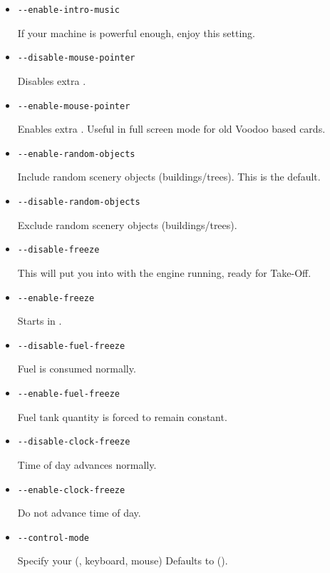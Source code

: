 \begin{itemize}
\item{\texttt{-$ $-enable-intro-music}}

  If your machine is powerful enough, enjoy this setting.

\item{\texttt{-$ $-disable-mouse-pointer}}

  Disables extra .

\item{\texttt{-$ $-enable-mouse-pointer}}

  Enables extra . Useful in full screen mode for
  old Voodoo based cards.

\item{\texttt{-$ $-enable-random-objects}}

  Include random scenery objects (buildings/trees). This is the default.

\item{\texttt{-$ $-disable-random-objects}}

  Exclude random scenery objects (buildings/trees).

\item{\texttt{-$ $-disable-freeze}}

  This will put you into \FlightGear{} with the engine running, ready
  for Take-Off.

\item{\texttt{-$ $-enable-freeze}}

  Starts \FlightGear{} in .

\item{\texttt{-$ $-disable-fuel-freeze}}

  Fuel is consumed normally.

\item{\texttt{-$ $-enable-fuel-freeze}}

  Fuel tank quantity is forced to remain constant.

\item{\texttt{-$ $-disable-clock-freeze}}

  Time of day advances normally.

\item{\texttt{-$ $-enable-clock-freeze}}

  Do not advance time of day.

\item{\texttt{-$ $-control-mode}}

  Specify your  (,  keyboard,
  mouse) Defaults to  ().


\end{itemize}
